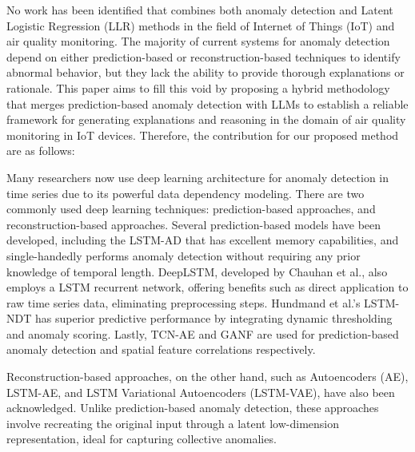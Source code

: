 \documentclass[final,3p,times,twocolumn]{elsarticle}
\begin{document}
No work has been identified that combines both anomaly detection and Latent Logistic Regression (LLR) methods in the field of Internet of Things (IoT) and air quality monitoring. The majority of current systems for anomaly detection depend on either prediction-based or reconstruction-based techniques to identify abnormal behavior, but they lack the ability to provide thorough explanations or rationale. This paper aims to fill this void by proposing a hybrid methodology that merges prediction-based anomaly detection with LLMs to establish a reliable framework for generating explanations and reasoning in the domain of air quality monitoring in IoT devices. Therefore, the contribution for our proposed method are as follows:

Many researchers now use deep learning architecture for anomaly detection in time series due to its powerful data dependency modeling. There are two commonly used deep learning techniques: prediction-based approaches, and reconstruction-based approaches. Several prediction-based models have been developed, including the LSTM-AD that has excellent memory capabilities, and single-handedly performs anomaly detection without requiring any prior knowledge of temporal length. DeepLSTM, developed by Chauhan et al., also employs a LSTM recurrent network, offering benefits such as direct application to raw time series data, eliminating preprocessing steps. Hundmand et al.'s LSTM-NDT has superior predictive performance by integrating dynamic thresholding and anomaly scoring. Lastly, TCN-AE and GANF are used for prediction-based anomaly detection and spatial feature correlations respectively. 

Reconstruction-based approaches, on the other hand, such as Autoencoders (AE), LSTM-AE, and LSTM Variational Autoencoders (LSTM-VAE), have also been acknowledged. Unlike prediction-based anomaly detection, these approaches involve recreating the original input through a latent low-dimension representation, ideal for capturing collective anomalies. 
\end{document}
